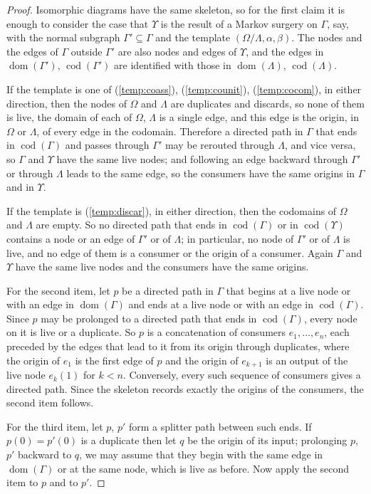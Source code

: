 \documentclass[12pt]{amsart}
\theoremstyle{plain}
\theoremstyle{definition}
\theoremstyle{remark}
\numberwithin{equation}{section}
\theoremstyle{plain}
\DeclareMathOperator{\dom}{dom}
\DeclareMathOperator{\cod}{cod}
\newcommand{\0}{\emptyset}
\newcommand{\sub}{\subseteq}
\begin{document}
\begin{proof}
Isomorphic diagrams have the same skeleton, so for the first claim it is enough to consider the case that $\Upsilon$ is the result of a Markov surgery on $\Gamma$, say, with the normal subgraph $\Gamma' \sub \Gamma$ and the template $(\Omega / \Lambda, \alpha, \beta)$. The nodes and the edges of $\Gamma$ outside $\Gamma'$ are also nodes and edges of $\Upsilon$, and the edges in $\dom(\Gamma')$, $\cod(\Gamma')$ are identified with those in $\dom(\Lambda)$, $\cod(\Lambda)$.

If the template is one of (\ref{temp:coass}), (\ref{temp:counit}), (\ref{temp:cocom}), in either direction, then the nodes of $\Omega$ and $\Lambda$ are duplicates and discards, so none of them is live, the domain of each of $\Omega$, $\Lambda$ is a single edge, and this edge is the origin, in $\Omega$ or $\Lambda$, of every edge in the codomain. Therefore a directed path in $\Gamma$ that ends in $\cod(\Gamma)$ and passes through $\Gamma'$ may be rerouted through $\Lambda$, and vice versa, so $\Gamma$ and $\Upsilon$ have the same live nodes; and following an edge backward through $\Gamma'$ or through $\Lambda$ leads to the same edge, so the consumers have the same origins in $\Gamma$ and in $\Upsilon$.

If the template is (\ref{temp:discar}), in either direction, then the codomains of $\Omega$ and $\Lambda$ are empty. So no directed path that ends in $\cod(\Gamma)$ or in $\cod(\Upsilon)$ contains a node or an edge of $\Gamma'$ or of $\Lambda$; in particular, no node of $\Gamma'$ or of $\Lambda$ is live, and no edge of them is a consumer or the origin of a consumer. Again $\Gamma$ and $\Upsilon$ have the same live nodes and the consumers have the same origins.

For the second item, let $p$ be a directed path in $\Gamma$ that begins at a live node or with an edge in $\dom(\Gamma)$ and ends at a live node or with an edge in $\cod(\Gamma)$. Since $p$ may be prolonged to a directed path that ends in $\cod(\Gamma)$, every node on it is live or a duplicate. So $p$ is a concatenation of consumers $e_1, \ldots, e_n$, each preceded by the edges that lead to it from its origin through duplicates, where the origin of $e_1$ is the first edge of $p$ and the origin of $e_{k+1}$ is an output of the live node $e_k(1)$ for $k < n$. Conversely, every such sequence of consumers gives a directed path. Since the skeleton records exactly the origins of the consumers, the second item follows.

For the third item, let $p$, $p'$ form a splitter path between such ends. If $p(0) = p'(0)$ is a duplicate then let $q$ be the origin of its input; prolonging $p$, $p'$ backward to $q$, we may assume that they begin with the same edge in $\dom(\Gamma)$ or at the same node, which is live as before. Now apply the second item to $p$ and to $p'$.


\end{proof}
\end{document}

